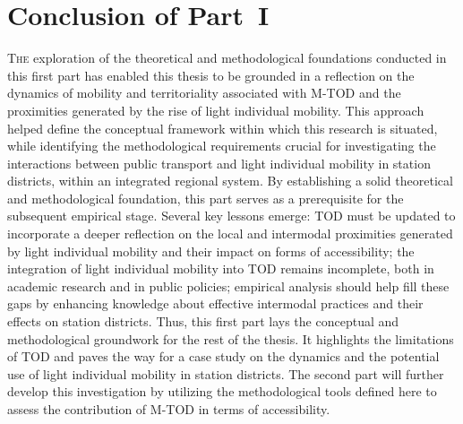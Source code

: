 
\cleardoublepage
\section*{Conclusion of Part~I
    \label{part1:conclusion}
    }

\lettrine[lines=3, findent=8pt, nindent=0pt]{ T}{he} exploration of the theoretical and methodological foundations conducted in this first part has enabled this thesis to be grounded in a reflection on the dynamics of mobility and territoriality associated with \acrshort{M-TOD} and the proximities generated by the rise of light individual mobility. This approach helped define the conceptual framework within which this research is situated, while identifying the methodological requirements crucial for investigating the interactions between public transport and light individual mobility in station districts, within an integrated regional system. By establishing a solid theoretical and methodological foundation, this part serves as a prerequisite for the subsequent empirical stage. Several key lessons emerge: \acrshort{TOD} must be updated to incorporate a deeper reflection on the local and intermodal proximities generated by light individual mobility and their impact on forms of accessibility; the integration of light individual mobility into \acrshort{TOD} remains incomplete, both in academic research and in public policies; empirical analysis should help fill these gaps by enhancing knowledge about effective intermodal practices and their effects on station districts. Thus, this first part lays the conceptual and methodological groundwork for the rest of the thesis. It highlights the limitations of \acrshort{TOD} and paves the way for a case study on the dynamics and the potential use of light individual mobility in station districts. The second part will further develop this investigation by utilizing the methodological tools defined here to assess the contribution of \acrshort{M-TOD} in terms of accessibility.%
